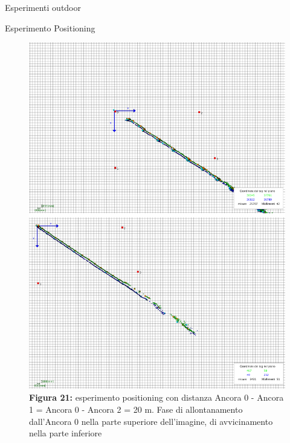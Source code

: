 \documentclass[12pt]{report}
\begin{document}
\begin{section}{Esperimenti outdoor}
\begin{subsection}{Esperimento Positioning}
			\begin{figure}[H]
				\centering
				\includegraphics[scale=0.2]{EspOutPos1}
	 			\caption{\textbf{Figura 21:} esperimento positioning con distanza Ancora 0 - Ancora 1 = Ancora 0 - Ancora 2 = 20 m. Fase di allontanamento dall'Ancora 0 nella parte superiore dell'imagine, di avvicinamento nella parte inferiore\label{EspOutPos1}}
			\end{figure}


\end{subsection}
\end{section}
\end{document}
